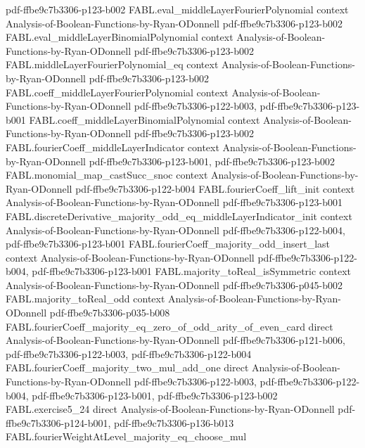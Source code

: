 \begin{theorem}
  {pdf-ffbe9c7b3306-p123-b002}
\proofstep
  {FABL.eval_middleLayerFourierPolynomial}
  {context}
  {Analysis-of-Boolean-Functions-by-Ryan-ODonnell}
  {pdf-ffbe9c7b3306-p123-b002}
\proofstep
  {FABL.eval_middleLayerBinomialPolynomial}
  {context}
  {Analysis-of-Boolean-Functions-by-Ryan-ODonnell}
  {pdf-ffbe9c7b3306-p123-b002}
\proofstep
  {FABL.middleLayerFourierPolynomial_eq}
  {context}
  {Analysis-of-Boolean-Functions-by-Ryan-ODonnell}
  {pdf-ffbe9c7b3306-p123-b002}
\proofstep
  {FABL.coeff_middleLayerFourierPolynomial}
  {context}
  {Analysis-of-Boolean-Functions-by-Ryan-ODonnell}
  {pdf-ffbe9c7b3306-p122-b003,
    pdf-ffbe9c7b3306-p123-b001}
\proofstep
  {FABL.coeff_middleLayerBinomialPolynomial}
  {context}
  {Analysis-of-Boolean-Functions-by-Ryan-ODonnell}
  {pdf-ffbe9c7b3306-p123-b002}
\proofstep
  {FABL.fourierCoeff_middleLayerIndicator}
  {context}
  {Analysis-of-Boolean-Functions-by-Ryan-ODonnell}
  {pdf-ffbe9c7b3306-p123-b001,
    pdf-ffbe9c7b3306-p123-b002}
\proofstep
  {FABL.monomial_map_castSucc_snoc}
  {context}
  {Analysis-of-Boolean-Functions-by-Ryan-ODonnell}
  {pdf-ffbe9c7b3306-p122-b004}
\proofstep
  {FABL.fourierCoeff_lift_init}
  {context}
  {Analysis-of-Boolean-Functions-by-Ryan-ODonnell}
  {pdf-ffbe9c7b3306-p123-b001}
\proofstep
  {FABL.discreteDerivative_majority_odd_eq_middleLayerIndicator_init}
  {context}
  {Analysis-of-Boolean-Functions-by-Ryan-ODonnell}
  {pdf-ffbe9c7b3306-p122-b004,
    pdf-ffbe9c7b3306-p123-b001}
\proofstep
  {FABL.fourierCoeff_majority_odd_insert_last}
  {context}
  {Analysis-of-Boolean-Functions-by-Ryan-ODonnell}
  {pdf-ffbe9c7b3306-p122-b004,
    pdf-ffbe9c7b3306-p123-b001}
\proofstep
  {FABL.majority_toReal_isSymmetric}
  {context}
  {Analysis-of-Boolean-Functions-by-Ryan-ODonnell}
  {pdf-ffbe9c7b3306-p045-b002}
\proofstep
  {FABL.majority_toReal_odd}
  {context}
  {Analysis-of-Boolean-Functions-by-Ryan-ODonnell}
  {pdf-ffbe9c7b3306-p035-b008}
\proofstep
  {FABL.fourierCoeff_majority_eq_zero_of_odd_arity_of_even_card}
  {direct}
  {Analysis-of-Boolean-Functions-by-Ryan-ODonnell}
  {pdf-ffbe9c7b3306-p121-b006,
    pdf-ffbe9c7b3306-p122-b003,
    pdf-ffbe9c7b3306-p122-b004}
\proofstep
  {FABL.fourierCoeff_majority_two_mul_add_one}
  {direct}
  {Analysis-of-Boolean-Functions-by-Ryan-ODonnell}
  {pdf-ffbe9c7b3306-p122-b003,
    pdf-ffbe9c7b3306-p122-b004,
    pdf-ffbe9c7b3306-p123-b001,
    pdf-ffbe9c7b3306-p123-b002}
\proofstep
  {FABL.exercise5_24}
  {direct}
  {Analysis-of-Boolean-Functions-by-Ryan-ODonnell}
  {pdf-ffbe9c7b3306-p124-b001,
    pdf-ffbe9c7b3306-p136-b013}
\proofstep
  {FABL.fourierWeightAtLevel_majority_eq_choose_mul}

\end{theorem}
